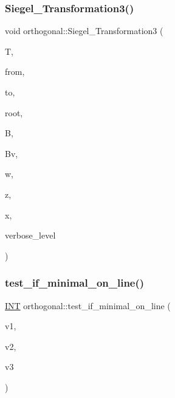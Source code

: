 \subsubsection{\texorpdfstring{Siegel\+\_\+\+Transformation3()}{Siegel\_Transformation3()}}
{\footnotesize\ttfamily void orthogonal\+::\+Siegel\+\_\+\+Transformation3 (\begin{DoxyParamCaption}\item[{\mbox{\hyperlink{galois_8h_a09fddde158a3a20bd2dcadb609de11dc}{I\+NT}} $\ast$}]{T,  }\item[{\mbox{\hyperlink{galois_8h_a09fddde158a3a20bd2dcadb609de11dc}{I\+NT}} $\ast$}]{from,  }\item[{\mbox{\hyperlink{galois_8h_a09fddde158a3a20bd2dcadb609de11dc}{I\+NT}} $\ast$}]{to,  }\item[{\mbox{\hyperlink{galois_8h_a09fddde158a3a20bd2dcadb609de11dc}{I\+NT}} $\ast$}]{root,  }\item[{\mbox{\hyperlink{galois_8h_a09fddde158a3a20bd2dcadb609de11dc}{I\+NT}} $\ast$}]{B,  }\item[{\mbox{\hyperlink{galois_8h_a09fddde158a3a20bd2dcadb609de11dc}{I\+NT}} $\ast$}]{Bv,  }\item[{\mbox{\hyperlink{galois_8h_a09fddde158a3a20bd2dcadb609de11dc}{I\+NT}} $\ast$}]{w,  }\item[{\mbox{\hyperlink{galois_8h_a09fddde158a3a20bd2dcadb609de11dc}{I\+NT}} $\ast$}]{z,  }\item[{\mbox{\hyperlink{galois_8h_a09fddde158a3a20bd2dcadb609de11dc}{I\+NT}} $\ast$}]{x,  }\item[{\mbox{\hyperlink{galois_8h_a09fddde158a3a20bd2dcadb609de11dc}{I\+NT}}}]{verbose\+\_\+level }\end{DoxyParamCaption})}

\mbox{\label{classorthogonal_ac1c98fb2e2bea810ab68ccc3097528b1}} 
\subsubsection{\texorpdfstring{test\+\_\+if\+\_\+minimal\+\_\+on\+\_\+line()}{test\_if\_minimal\_on\_line()}}
{\footnotesize\ttfamily \mbox{\hyperlink{galois_8h_a09fddde158a3a20bd2dcadb609de11dc}{I\+NT}} orthogonal\+::test\+\_\+if\+\_\+minimal\+\_\+on\+\_\+line (\begin{DoxyParamCaption}\item[{\mbox{\hyperlink{galois_8h_a09fddde158a3a20bd2dcadb609de11dc}{I\+NT}} $\ast$}]{v1,  }\item[{\mbox{\hyperlink{galois_8h_a09fddde158a3a20bd2dcadb609de11dc}{I\+NT}} $\ast$}]{v2,  }\item[{\mbox{\hyperlink{galois_8h_a09fddde158a3a20bd2dcadb609de11dc}{I\+NT}} $\ast$}]{v3 }\end{DoxyParamCaption})}

